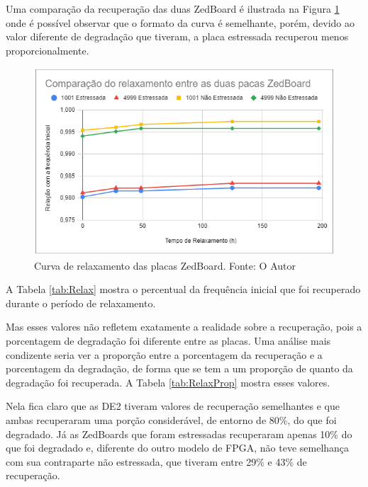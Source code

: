 Uma comparação da recuperação das duas ZedBoard é ilustrada na Figura \ref{fig:RelaxZedBoard} onde é possível observar que o formato da curva é semelhante, porém, devido ao valor diferente de degradação que tiveram, a placa estressada recuperou menos proporcionalmente.

\begin{figure}[H]
    \centering
    \includegraphics[scale=0.75]{figures/Resultados/RelaxZedBoard}
    \caption{Curva de relaxamento das placas ZedBoard. Fonte: O Autor}
    \label{fig:RelaxZedBoard}
\end{figure}

A Tabela \ref{tab:Relax} mostra o percentual da frequência inicial que foi recuperado durante o período de relaxamento. 



Mas esses valores não refletem exatamente a realidade sobre a recuperação, pois a porcentagem de degradação foi diferente entre as placas. Uma análise mais condizente seria ver a proporção entre a porcentagem da recuperação e a porcentagem da degradação, de forma que se tem a um proporção de quanto da degradação foi recuperada. A Tabela \ref{tab:RelaxProp} mostra esses valores.



Nela fica claro que as DE2 tiveram valores de recuperação semelhantes e que ambas recuperaram uma porção considerável, de entorno de 80\%, do que foi degradado. Já as ZedBoards que foram estressadas recuperaram apenas 10\% do que foi degradado e, diferente do outro modelo de FPGA, não teve semelhança com sua contraparte não estressada, que tiveram entre 29\% e 43\% de recuperação. 


